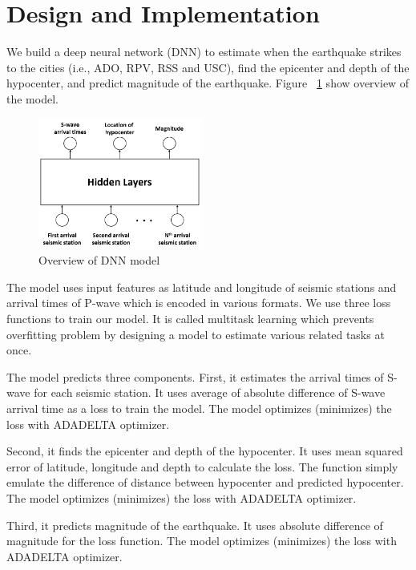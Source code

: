 \section{Design and Implementation}

We build a deep neural network (DNN) to estimate when the earthquake strikes to the cities (i.e., ADO, RPV, RSS and USC), find the epicenter and depth of the hypocenter, and predict magnitude of the earthquake. Figure ~\ref{fig:overview_model} show overview of the model.

\begin{figure}[t]
\includegraphics[width=0.48\textwidth]{figs/overview_model.png}
\caption{Overview of DNN model}
\label{fig:overview_model}
\end{figure}

The model uses input features as latitude and longitude of seismic stations and arrival times of P-wave which is encoded in various formats. We use three loss functions to train our model. It is called multitask learning \cite{baxter1995learning} which prevents overfitting problem by designing a model to estimate various related tasks at once.

The model predicts three components. First, it estimates the arrival times of S-wave for each seismic station. It uses average of absolute difference of S-wave arrival time as a loss to train the model. The model optimizes (minimizes) the loss with ADADELTA \cite{zeiler2012adadelta} optimizer.

Second, it finds the epicenter and depth of the hypocenter. It uses mean squared error of latitude, longitude and depth to calculate the loss. The function simply emulate the difference of distance between hypocenter and predicted hypocenter. The model optimizes (minimizes) the loss with ADADELTA optimizer.

Third, it predicts magnitude of the earthquake. It uses absolute difference of magnitude for the loss function. The model optimizes (minimizes) the loss with ADADELTA optimizer.
